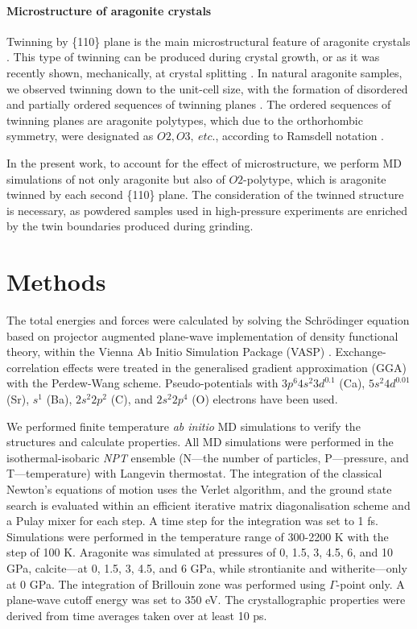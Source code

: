 \documentclass[journal=jacsat,manuscript=article]{achemso}
\begin{document}
	\paragraph{Microstructure of aragonite crystals}
Twinning by \{110\} plane is the main microstructural feature of aragonite crystals \cite{marsh1980, suzuki2012, gavr2019_arag}. 
This type of twinning can be produced during crystal growth, or as it was recently shown, mechanically, at crystal splitting \cite{shin2016}. 
In natural aragonite samples, we observed twinning down to the unit-cell size, with the formation of disordered and partially ordered sequences of twinning planes \cite{gavr2019_arag}. 
The ordered sequences of twinning planes are aragonite polytypes, which due to the orthorhombic symmetry, were designated as $O2, O3,\ etc.$, according to Ramsdell notation \cite{gavr2019_arag}. 

In the present work, to account for the effect of microstructure, we perform MD simulations of not only aragonite but also of $O2$-polytype, which is aragonite twinned by each second \{110\} plane. 
The consideration of the twinned structure is necessary, as powdered samples used in high-pressure experiments are enriched by the twin boundaries produced during grinding.


			\section{Methods}
The total energies and forces were calculated by solving the Schr{\"o}dinger equation based on projector augmented plane-wave implementation of density functional theory, within the Vienna Ab Initio Simulation Package (VASP) \cite{kresse1999}.
Exchange-correlation effects were treated in the generalised gradient approximation (GGA) with the Perdew-Wang scheme\cite{perdew1992}. 
Pseudo-potentials with $3p^{6}4s^{2}3d^{0.1}$ (Ca), $5s^{2}4d^{0.01}$ (Sr), $s^{1}$ (Ba), $2s^{2}2p^{2}$ (C), and $2s^{2}2p^{4}$ (O) electrons have been used.

We performed finite temperature {\it ab initio} MD simulations to verify the structures and calculate properties. All MD simulations were performed in the isothermal-isobaric {\it NPT} ensemble (N---the number of particles, P---pressure, and T---temperature) with Langevin thermostat. The integration of the classical Newton's equations of motion uses the Verlet algorithm, and the ground state search is evaluated within an efficient iterative matrix diagonalisation scheme and a Pulay mixer for each step. A time step for the integration was set to 1 fs. Simulations were performed in the temperature range of 300-2200 K with the step of 100 K. Aragonite  was simulated at pressures of 0, 1.5, 3, 4.5, 6, and 10 GPa, calcite---at 0, 1.5, 3, 4.5, and 6 GPa, while strontianite and witherite---only at 0 GPa.
The integration of Brillouin zone was performed using $\Gamma$-point only. A plane-wave cutoff energy was set to 350 eV. The crystallographic properties were derived from time averages taken over at least 10 ps.
\end{document}
